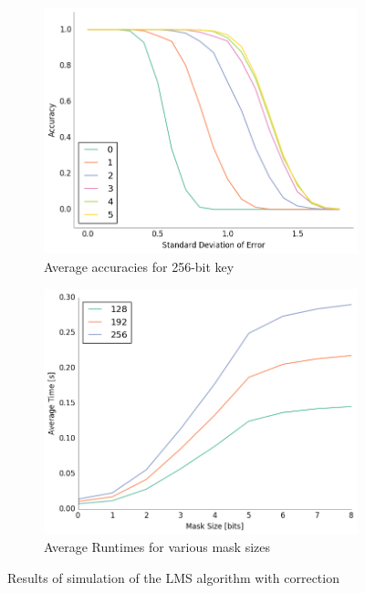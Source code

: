 \documentclass[11pt,letterpaper]{article}
\begin{document}
\begin{figure}[htp]
    \vspace{1cm}
    \begin{subfigure}{0.48\textwidth}
        \centering
        \includegraphics[width=\textwidth]{Images/accuracy_256.png}
        \caption{Average accuracies for 256-bit key}
    \end{subfigure}
    \hspace{.35cm}
    \begin{subfigure}{0.48\textwidth}
        \centering
        \includegraphics[width=\textwidth]{Images/times.png}
        \caption{Average Runtimes for various mask sizes}
    \end{subfigure}
    \vspace{.25cm}
    \caption{Results of simulation of the LMS algorithm with correction}
    \label{fig:plots}
\end{figure}
\end{document}
